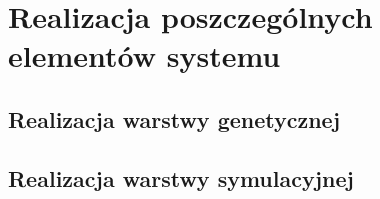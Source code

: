 \section{Realizacja poszczególnych elementów systemu}
\subsection{Realizacja warstwy genetycznej}

\subsection{Realizacja warstwy symulacyjnej}

